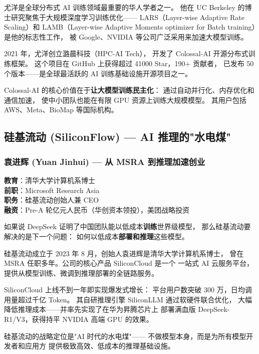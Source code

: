 尤洋是全球分布式 AI 训练领域最重要的华人学者之一。
他在 UC Berkeley 的博士研究聚焦于大规模深度学习训练优化——
LARS（Layer-wise Adaptive Rate Scaling）和 LAMB（Layer-wise Adaptive
Moments optimizer for Batch training）是他的标志性工作，
被 Google、NVIDIA 等公司广泛采用来加速大模型训练。

2021 年，尤洋创立潞晨科技（HPC-AI Tech），
开发了 Colossal-AI 开源分布式训练框架。
这个项目在 GitHub 上获得超过 41000 Star，190+ 贡献者，
已发布 50 个版本——是全球最活跃的 AI 训练基础设施开源项目之一。

Colossal-AI 的核心价值在于\textbf{让大模型训练民主化}：
通过自动并行化、内存优化和通信加速，
使中小团队也能在有限 GPU 资源上训练大规模模型。
其用户包括 AWS、Meta、BioMap 等国际机构。


\subsection{硅基流动 (SiliconFlow) — AI 推理的"水电煤"}

\subsubsection{袁进辉 (Yuan Jinhui) — 从 MSRA 到推理加速创业}

\begin{keybox}
\textbf{教育}：清华大学计算机系博士 \\
\textbf{前职}：Microsoft Research Asia \\
\textbf{职务}：硅基流动创始人兼 CEO \\
\textbf{融资}：Pre-A 轮亿元人民币（华创资本领投），美团战略投资
\end{keybox}

如果说 DeepSeek 证明了中国团队能以低成本\textbf{训练}世界级模型，
那么硅基流动要解决的是下一个问题：
如何以低成本\textbf{部署和推理}这些模型。

硅基流动成立于 2023 年 8 月，创始人袁进辉是清华大学计算机系博士，
曾在 MSRA 任职多年。公司的核心产品 SiliconCloud 是一个
一站式 AI 云服务平台，提供从模型训练、微调到推理部署的全链路服务。

SiliconCloud 上线不到一年即实现爆发式增长：
平台用户数突破 300 万，日均调用量超过千亿 Token。
其自研推理引擎 SiliconLLM 通过软硬件联合优化，
大幅降低推理成本——并率先实现了在华为昇腾芯片上
部署满血版 DeepSeek-R1/V3，获得持平 NVIDIA 高端 GPU 的效果。

硅基流动的战略定位是"AI 时代的水电煤"——
不做模型本身，而是为所有模型开发者和应用方
提供极致高效、低成本的推理基础设施。


